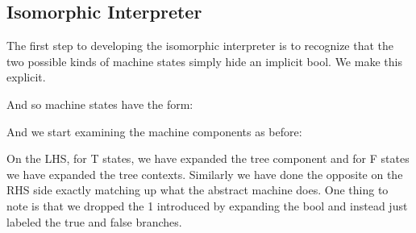 \documentclass{llncs}
\begin{document}
{\subsection{Isomorphic Interpreter}

The first step to developing the isomorphic interpreter is to
recognize that the two possible kinds of machine states simply hide an
implicit {{bool}}. We make this explicit. 


And so machine states have the form:



And we start examining the machine components as before:

\begin{center}
\end{center}

On the LHS, for {{T}} states, we have expanded the tree component and
for {{F}} states we have expanded the tree contexts. Similarly we have
done the opposite on the RHS side exactly matching up what the
abstract machine does. One thing to note is that we dropped the {{1}}
introduced by expanding the {{bool}} and instead just labeled the
{{true}} and {{false}} branches.

}
\end{document}
